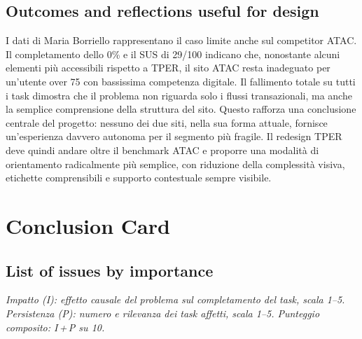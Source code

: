 \documentclass[11pt,a4paper]{article}
\begin{document}
\subsection*{Outcomes and reflections useful for design}
\begin{tcolorbox}[colback=backgroundColor,colframe=borderColor,arc=2mm]
I dati di Maria Borriello rappresentano il caso limite anche sul competitor ATAC. Il completamento dello 0\% e il SUS di 29/100 indicano che, nonostante alcuni elementi più accessibili rispetto a TPER, il sito ATAC resta inadeguato per un'utente over 75 con bassissima competenza digitale. Il fallimento totale su tutti i task dimostra che il problema non riguarda solo i flussi transazionali, ma anche la semplice comprensione della struttura del sito. Questo rafforza una conclusione centrale del progetto: nessuno dei due siti, nella sua forma attuale, fornisce un'esperienza davvero autonoma per il segmento più fragile. Il redesign TPER deve quindi andare oltre il benchmark ATAC e proporre una modalità di orientamento radicalmente più semplice, con riduzione della complessità visiva, etichette comprensibili e supporto contestuale sempre visibile.
\end{tcolorbox}



\newpage

\section{Conclusion Card}

\subsection*{List of issues by importance}

\noindent\textit{Impatto (I): effetto causale del problema sul completamento 
del task, scala 1--5. Persistenza (P): numero e rilevanza dei task affetti, 
scala 1--5. Punteggio composito: I\,+\,P su 10.}
\end{document}
